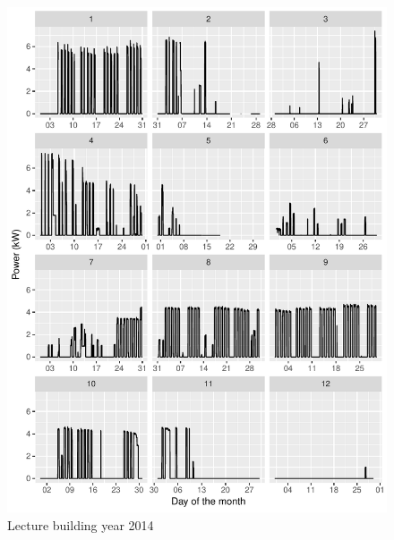 \documentclass[11pt, oneside]{article}   	%
\begin{document}
\begin{figure}
\includegraphics[keepaspectratio]{lecture_build_Y2014.pdf}
\caption{Lecture building year 2014 }
\end{figure}
\end{document}
